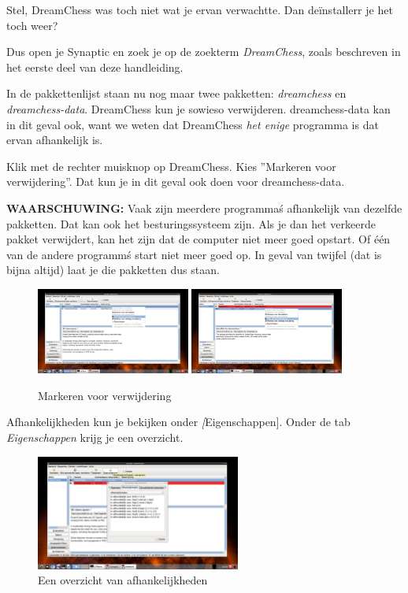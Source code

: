 \documentclass[12pt,a4paper]{article}
\begin{document}
Stel, DreamChess was toch niet wat je ervan verwachtte. Dan de\"{i}nstallerr je het toch weer?

Dus open je Synaptic en zoek je op de zoekterm \emph{DreamChess}, zoals beschreven in het eerste deel van deze handleiding. 

In de pakkettenlijst staan nu nog maar twee pakketten: \emph{dreamchess} en \emph{dreamchess-data}. DreamChess kun je sowieso verwijderen. dreamchess-data kan in dit geval ook, want we weten dat DreamChess \emph{het enige} programma is dat ervan afhankelijk is. 

Klik met de rechter muisknop op DreamChess. Kies ''Markeren voor verwijdering''. Dat kun je in dit geval ook doen voor dreamchess-data. 

\textbf{WAARSCHUWING:} Vaak zijn meerdere programma\'s afhankelijk van dezelfde pakketten. Dat kan ook het besturingssysteem zijn. Als je dan het verkeerde pakket verwijdert, kan het zijn dat de computer niet meer goed opstart. Of \'{e}\'{e}n van de andere programm\'s start niet meer goed op. In geval van twijfel (dat is bijna altijd) laat je die pakketten dus staan. 

\begin{figure} [H]
\centering
\includegraphics[width=0.45\textwidth]{plaatje16}
\includegraphics[width=0.45\textwidth]{plaatje17}
\caption{Markeren voor verwijdering}
\label{plaatje16}
\end{figure}

Afhankelijkheden kun je bekijken onder \emph[Eigenschappen]. Onder de tab \emph{Eigenschappen} krijg je een overzicht.  

\begin{figure} [H]
\centering
\includegraphics[width=0.6\textwidth]{plaatje18}
\caption{Een overzicht van afhankelijkheden}
\label{plaatje18}
\end{figure}
\end{document}
